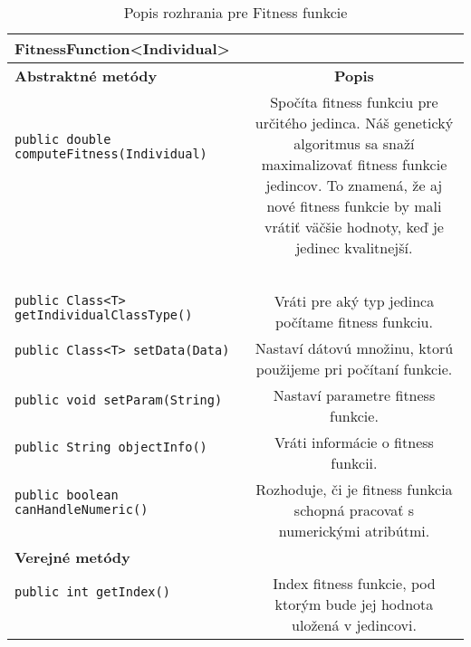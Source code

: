 \begin{table}
\centering
\begin{tabular}{|l|c|}
\hline
\textbf{FitnessFunction<Individual>} & \\
\hline\hline
\textbf{Abstraktné metódy} & \textbf{Popis} \\
\hline
\verb|public double computeFitness(Individual)| & \multirow{4}{5cm}{Spočíta fitness funkciu pre určitého jedinca. Náš genetický algoritmus sa snaží maximalizovať fitness funkcie jedincov. To znamená, že aj nové fitness funkcie by mali vrátiť väčšie hodnoty, keď je jedinec kvalitnejší.} \\
& \\
& \\
& \\
& \\
& \\
& \\
& \\
& \\
\hline
\verb|public Class<T> getIndividualClassType()| & \multirow{2}{5cm}{Vráti pre aký typ jedinca počítame fitness funkciu.} \\
& \\
\hline
\verb|public Class<T> setData(Data)| & \multirow{3}{5cm}{Nastaví dátovú množinu, ktorú použijeme pri počítaní funkcie.} \\
& \\
& \\
\hline
\verb|public void setParam(String)| & \multirow{2}{5cm}{Nastaví parametre fitness funkcie.} \\
& \\
\hline
\verb|public String objectInfo()| & \multirow{2}{5cm}{Vráti informácie o fitness funkcii.} \\
& \\
\hline
\verb|public boolean canHandleNumeric()| & \multirow{3}{5cm}{Rozhoduje, či je fitness funkcia schopná pracovať s numerickými atribútmi.} \\
& \\
& \\
\hline\hline
\textbf{Verejné metódy} & \\
\hline
\verb|public int getIndex()| & \multirow{3}{5cm}{Index fitness funkcie, pod ktorým bude jej hodnota uložená v jedincovi.} \\
& \\
& \\
\hline
\end{tabular}
\caption{Popis rozhrania pre Fitness funkcie}\label{fig:tabfit}
\end{table}

